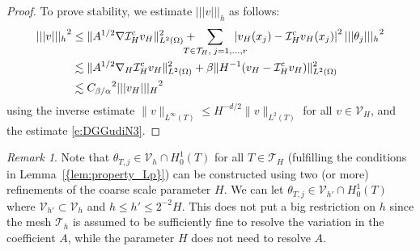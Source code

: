\documentclass[10pt]{article}
\numberwithin{equation}{section}
\theoremstyle{plain}
\theoremstyle{definition}
\theoremstyle{remark}
\newtheorem{rem}[theorem]{Remark}
\begin{document}
\begin{proof}
To prove stability, we estimate ${||| {v} |||_h}$ as follows:
  \begin{equation}
    \begin{aligned}\notag
      {||| {v} |||_h}^2 & \leq \|{A}^{1/2}\nabla{\mathcal{I}^{\operatorname*{c}}_H} v_H\|^2_{L^2(\Omega)}+\hspace{-3ex}\sum_{T\in{\mathcal{T}}_H,\;j=1,\ldots,r}\hspace{-3ex}\left| v_H(x_j)-{\mathcal{I}^{\operatorname*{c}}_H} v_H(x_j) \right|^2{||| {\theta_j} |||_h}^2\\
      &\lesssim \|{A}^{1/2}\nabla_H{\mathcal{I}^{\operatorname*{c}}_H} v_H\|^2_{L^2(\Omega)}+{\beta}\|H^{-1}( v_H-{\mathcal{I}^{\operatorname*{c}}_H} v_H) \|^2_{L^2(\Omega)}\\
      &\lesssim {C_{{\beta}/{\alpha}}}^2 {||| {v_H} |||_H}^2
    \end{aligned}
  \end{equation}
  using the inverse estimate $\|v\|_{L^\infty(T)}\leq H^{-d/2}\|v\|_{L^2(T)}$ for all $v\in{\mathcal{V}_H}$, and the estimate \eqref{e:DGGudiN3}.
\end{proof}
\begin{rem}
  Note that $\theta_{T,j}\in{\mathcal{V}_h}\cap H^1_0(T)$ for all $T\in{\mathcal{T}}_H$ (fulfilling the conditions in {Lemma~\ref{{lem:property_Lp}}}) can be constructed using two (or more) refinements of the coarse scale parameter $H$. We can let $\theta_{T,j}\in{\mathcal{V}}_{h'}\cap H^1_0(T)$ where ${\mathcal{V}}_{h'}\subset{\mathcal{V}}_h$ and $h\leq h'\leq 2^{-2}H$. This does not put a big restriction on $h$ since the mesh ${\mathcal{T}}_h$ is assumed to be sufficiently fine to resolve the variation in the coefficient ${A}$, while the parameter $H$ does not need to resolve ${A}$.
\end{rem}
\end{document}
